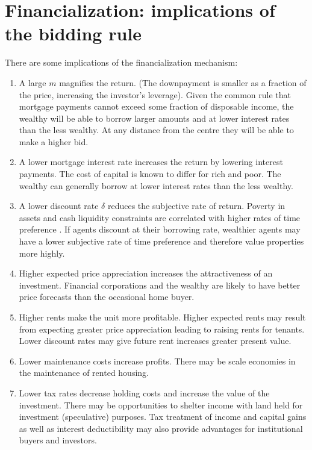 \section{Financialization: implications of the bidding rule}

There are some implications of the financialization mechanism:
\begin{enumerate}
\item A large $m$ magnifies the return. (The downpayment is smaller as a fraction of the price, increasing the investor's leverage). 
Given the  common rule that mortgage payments cannot exceed some fraction of disposable income, the wealthy will be able to borrow larger amounts and at lower interest rates than the less wealthy. At any distance from the centre they will be able to make a higher bid.

\item A lower mortgage interest rate increases the return by lowering interest payments. The cost of capital is known to differ for rich and poor.  The wealthy can generally borrow  at lower interest rates than the less wealthy. 

\item A lower discount rate $\delta$ reduces the subjective rate of return.  Poverty in assets and cash liquidity constraints are correlated with higher rates of time preference  \cite{carvalhoPovertyTimePreference2010}\cite{holdenPovertyMarketImperfections1998}. If agents discount at their borrowing rate, wealthier agents may have a lower subjective rate of time preference and therefore value properties more highly. 

\item Higher expected price appreciation increases the attractiveness of an investment. Financial corporations and the wealthy are likely to have better price forecasts than  the occasional home buyer.

\item Higher rents make the unit more profitable. Higher expected  rents may result from expecting greater price appreciation  leading to raising rents for tenants. Lower discount rates may give future rent increases greater present value.

\item Lower maintenance costs increase profits. There may be scale economies in the maintenance  of rented housing. 

\item Lower tax rates decrease holding costs and increase the value of the investment. There may be opportunities to shelter income with land held for investment (speculative) purposes. Tax treatment of income and capital gains as well as interest deductibility may also provide advantages for institutional buyers and investors.%
\end{enumerate}


